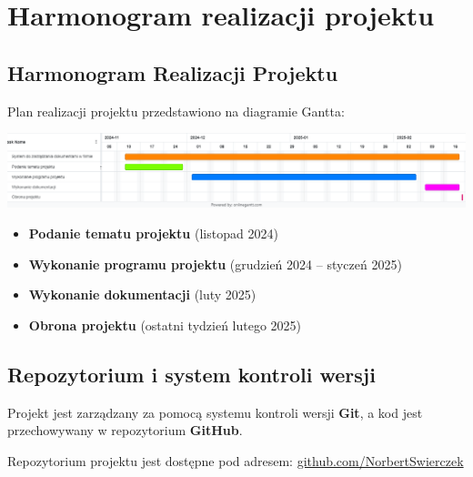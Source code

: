 ﻿%
\chapter{Harmonogram realizacji projektu}


\section{Harmonogram Realizacji Projektu}
Plan realizacji projektu przedstawiono na diagramie Gantta:

\begin{center}
    \includegraphics[width=1\textwidth]{gantt.png}
\end{center}

\begin{itemize}
    \item \textbf{Podanie tematu projektu} (listopad 2024)
    \item \textbf{Wykonanie programu projektu} (grudzień 2024 – styczeń 2025)
    \item \textbf{Wykonanie dokumentacji} (luty 2025)
    \item \textbf{Obrona projektu} (ostatni tydzień lutego 2025)
\end{itemize}

\section{Repozytorium i system kontroli wersji}

Projekt jest zarządzany za pomocą systemu kontroli wersji \textbf{Git}, a kod jest przechowywany w repozytorium \textbf{GitHub}. 

Repozytorium projektu jest dostępne pod adresem:
\href{https://github.com/NorbertSwierczek/P-L_Programowanie-obiektowe_3IIZ-2023-GPL02/tree/main/projekt}{github.com/NorbertSwierczek}

